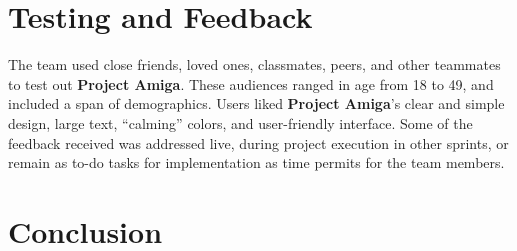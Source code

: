 \documentclass[10pt,american english]{article}
\begin{document}
\section*{Testing and Feedback}
The team used close friends, loved ones, classmates, peers, and other teammates to test out \textbf{Project Amiga}. These audiences ranged in age from 18 to 49, and included a span of demographics. Users liked \textbf{Project Amiga}'s clear and simple design, large text, ``calming'' colors, and user-friendly interface. Some of the feedback received was addressed live, during project execution in other sprints, or remain as to-do tasks for implementation as time permits for the team members.
\section*{Conclusion}
\end{document}
